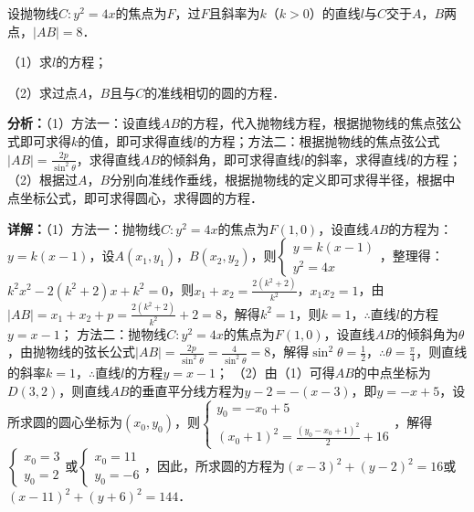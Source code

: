 \begin{question}[points=12]
设抛物线$C:y^2=4x$的焦点为$F$，过$F$且斜率为$k$（$k>0$）的直线$l$与$C$交于$A$，$B$两点，$|AB|=8$．

（1）求$l$的方程；

（2）求过点$A$，$B$且与$C$的准线相切的圆的方程．
\begin{solution}

\textbf{分析：}（1）方法一：设直线$AB$的方程，代入抛物线方程，根据抛物线的焦点弦公式即可求得$k$的值，即可求得直线$l$的方程；方法二：根据抛物线的焦点弦公式$|AB|=\frac{2p}{\sin^2\theta}$，求得直线$AB$的倾斜角，即可求得直线$l$的斜率，求得直线$l$的方程；
（2）根据过$A$，$B$分别向准线作垂线，根据抛物线的定义即可求得半径，根据中点坐标公式，即可求得圆心，求得圆的方程．

\textbf{详解：}（1）方法一：抛物线$C:y^2=4x$的焦点为$F(1,0)$，设直线$AB$的方程为：$y=k(x-1)$，设$A(x_1,y_1)$，$B(x_2,y_2)$，则$\begin{cases} y=k(x-1) \\ y^2=4x \end{cases}$，整理得：$k^2x^2-2(k^2+2)x+k^2=0$，则$x_1+x_2=\frac{2(k^2+2)}{k^2}$，$x_1x_2=1$，由$|AB|=x_1+x_2+p=\frac{2(k^2+2)}{k^2}+2=8$，解得$k^2=1$，则$k=1$，$\therefore$直线$l$的方程$y=x-1$；
方法二：抛物线$C:y^2=4x$的焦点为$F(1,0)$，设直线$AB$的倾斜角为$\theta$，由抛物线的弦长公式$|AB|=\frac{2p}{\sin^2\theta}=\frac{4}{\sin^2\theta}=8$，解得$\sin^2\theta=\frac{1}{2}$，$\therefore\theta=\frac{\pi}{4}$，则直线的斜率$k=1$，$\therefore$直线$l$的方程$y=x-1$；
（2）由（1）可得$AB$的中点坐标为$D(3,2)$，则直线$AB$的垂直平分线方程为$y-2=-(x-3)$，即$y=-x+5$，设所求圆的圆心坐标为$(x_0,y_0)$，则$\begin{cases} y_0=-x_0+5 \\ (x_0+1)^2=\frac{(y_0-x_0+1)^2}{2}+16 \end{cases}$，解得$\begin{cases} x_0=3 \\ y_0=2 \end{cases}$或$\begin{cases} x_0=11 \\ y_0=-6 \end{cases}$，因此，所求圆的方程为$(x-3)^2+(y-2)^2=16$或$(x-11)^2+(y+6)^2=144$．
\end{solution}
\end{question}

